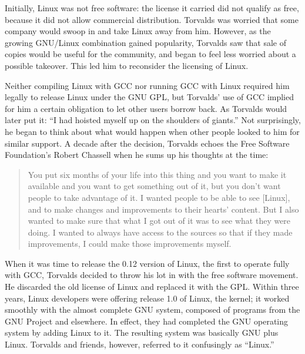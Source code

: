 Initially, Linux was not free software: the license it carried did not qualify as free, because it did not allow commercial distribution. Torvalds was worried that some company would swoop in and take Linux away from him.  However, as the growing GNU/Linux combination gained popularity, Torvalds saw that sale of copies would be useful for the community, and began to feel less worried about a possible takeover. This led him to reconsider the licensing of Linux.

Neither compiling Linux with GCC nor running GCC with Linux required him legally to release Linux under the GNU GPL, but Torvalds' use of GCC implied for him a certain obligation to let other users borrow back. As Torvalds would later put it: ``I had hoisted myself up on the shoulders of giants.'' Not surprisingly, he began to think about what would happen when other people looked to him for similar support. A decade after the decision, Torvalds echoes the Free Software Foundation's Robert Chassell when he sums up his thoughts at the time:

\begin{quote}
You put six months of your life into this thing and you want to make it available and you want to get something out of it, but you don't want people to take advantage of it. I wanted people to be able to see [Linux], and to make changes and improvements to their hearts' content. But I also wanted to make sure that what I got out of it was to see what they were doing. I wanted to always have access to the sources so that if they made improvements, I could make those improvements myself.
\end{quote}

When it was time to release the 0.12 version of Linux, the first to operate fully with GCC, Torvalds decided to throw his lot in with the free software movement. He discarded the old license of Linux and replaced it with the GPL. Within three years, Linux developers were offering release 1.0 of Linux, the kernel; it worked smoothly with the almost complete GNU system, composed of programs from the GNU Project and elsewhere.  In effect, they had completed the GNU operating system by adding Linux to it.  The resulting system was basically GNU plus Linux.  Torvalds and friends, however, referred to it confusingly as ``Linux.''

